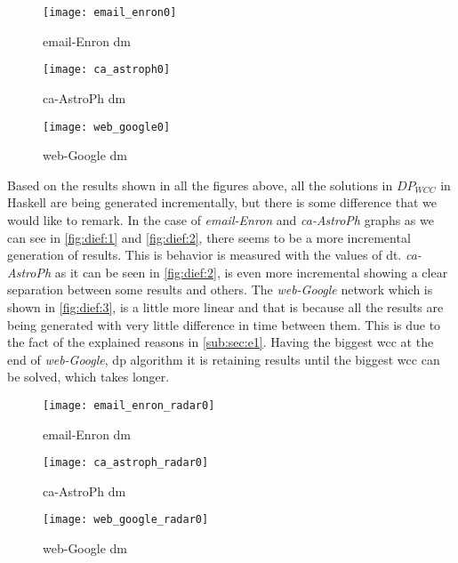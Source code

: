 \begin{figure}[!htb]
    \centering
    \begin{minipage}{0.33\textwidth}
     \texttt{[image: email\_enron0]}
      \caption{email-Enron \acrshort{dm}}
      \label{fig:dief:1}
    \end{minipage}%
    \begin{minipage}{0.33\textwidth}
     \texttt{[image: ca\_astroph0]}
      \caption{ca-AstroPh \acrshort{dm}}
      \label{fig:dief:2}
    \end{minipage}%
    \begin{minipage}{0.33\textwidth}
     \texttt{[image: web\_google0]}
      \caption{web-Google \acrshort{dm}}
      \label{fig:dief:3}
    \end{minipage}
\end{figure}

Based on the results shown in all the figures above, all the solutions in $DP_{WCC}$ in Haskell are being generated incrementally, but there is some difference that we would like to remark. In the case of \emph{email-Enron} and \emph{ca-AstroPh} graphs as we can see in \autoref{fig:dief:1} and \autoref{fig:dief:2}, there seems to be a more incremental generation of results. This is behavior is measured with the values of \acrfull{dt}. \emph{ca-AstroPh} as it can be seen in \autoref{fig:dief:2}, is even more incremental showing a clear separation between some results and others. The \emph{web-Google} network which is shown in \autoref{fig:dief:3}, is a little more linear and that is because all the results are being generated with very little difference in time between them. This is due to the fact of the explained reasons in \autoref{sub:sec:e1}. Having the biggest \acrshort{wcc} at the end of \emph{web-Google}, \acrshort{dp} algorithm it is retaining results until the biggest \acrshort{wcc} can be solved, which takes longer. 

\begin{figure}[!htb]
    \centering
    \begin{minipage}{0.33\textwidth}
     \texttt{[image: email\_enron\_radar0]}
      \caption{email-Enron \acrshort{dm}}
      \label{fig:dief:rad:1}
    \end{minipage}%
    \begin{minipage}{0.33\textwidth}
     \texttt{[image: ca\_astroph\_radar0]}
      \caption{ca-AstroPh \acrshort{dm}}
      \label{fig:dief:rad:2}
    \end{minipage}%
    \begin{minipage}{0.33\textwidth}
     \texttt{[image: web\_google\_radar0]}
      \caption{web-Google \acrshort{dm}}
      \label{fig:dief:rad:3}
    \end{minipage}
\end{figure}

